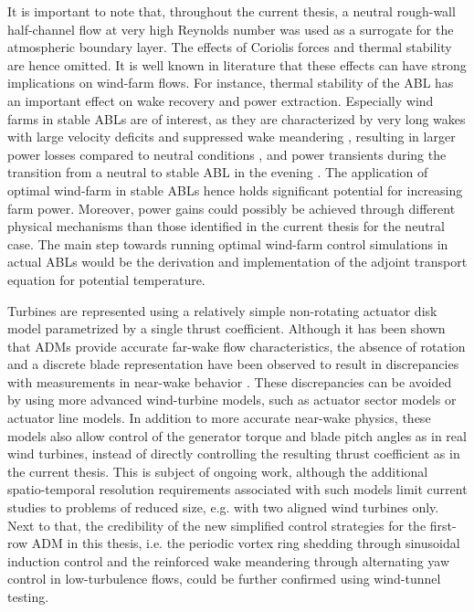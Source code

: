 It is important to note that, throughout the current thesis, a neutral rough-wall half-channel flow at very high Reynolds number was used as a surrogate for the atmospheric boundary layer. The effects of Coriolis forces and thermal stability are hence omitted. It is well known in literature that these effects can have strong implications on wind-farm flows. For instance, thermal stability of the ABL has an important effect on wake recovery and power extraction.  Especially wind farms in stable ABLs are of interest, as they are characterized by very long wakes with large velocity deficits and suppressed wake meandering \citep{larsen2009dependence,machefaux2016experimental}, resulting in larger power losses compared to neutral conditions \citep{barthelmie2010evaluation, dorenkamper}, and power transients during the transition from a neutral to stable ABL in the evening \citep{allaerts2017gravity}. The application of optimal wind-farm in stable ABLs hence holds significant potential for increasing farm power. Moreover, power gains could possibly be achieved through different physical mechanisms than those identified in the current thesis for the neutral case. The main step towards running optimal wind-farm control simulations in actual ABLs would be the derivation and implementation of the adjoint transport equation for potential temperature. 

Turbines are represented using a relatively simple non-rotating actuator disk model parametrized by a single thrust coefficient. Although it has been shown that ADMs provide accurate far-wake flow characteristics, the absence of rotation and a discrete blade representation have been observed to result in discrepancies with measurements in near-wake behavior \citep{wu2011large}. These discrepancies can be avoided by using more advanced wind-turbine models, such as actuator sector models or actuator line models. In addition to more accurate near-wake physics, these models also allow control of the generator torque and blade pitch angles as in real wind turbines, instead of directly controlling the resulting thrust coefficient as in the current thesis. This is subject of ongoing work, although the additional spatio-temporal resolution requirements associated with such models limit current studies to problems of reduced size, e.g. with two aligned wind turbines only. Next to that, the credibility of the new simplified control strategies for the first-row ADM in this thesis, i.e. the periodic vortex ring shedding through sinusoidal induction control and the reinforced wake meandering through alternating yaw control in low-turbulence flows, could be further confirmed using wind-tunnel testing. 

